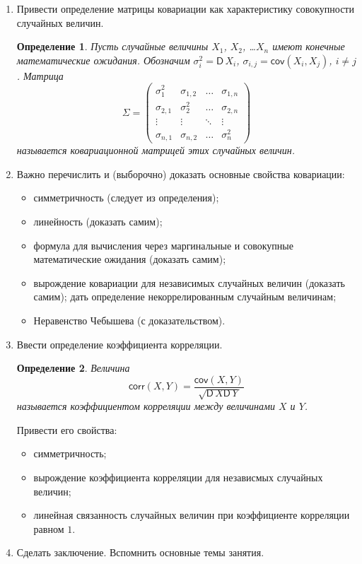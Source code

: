 \documentclass[14pt]{extarticle}
\newcommand{\cov}{\mathsf{cov}}
\newcommand{\corr}{\mathsf{corr}}
\newcommand{\var}{\mathsf{D}\,}
\theoremstyle{theorem}
\newtheorem{definition}{Определение}
\theoremstyle{remark}
\begin{document}
\begin{enumerate}
    \item Привести определение матрицы ковариации как характеристику совокупности случайных величин. 
    \begin{definition}
  Пусть случайные величины  $X_1$, $X_2$, \ldots $X_n$ имеют конечные математические
  ожидания. Обозначим $\sigma_i^2=\var X_i$, $\sigma_{i,j}=\cov(X_i, X_j)$, $i\neq
  j$. Матрица 
  \[
  \Sigma=
  \begin{pmatrix}
    \sigma_1^2 & \sigma_{1,2} & \ldots & \sigma_{1,n}\\
    \sigma_{2,1} & \sigma_{2}^2 & \ldots & \sigma_{2,n}\\
    \vdots & \vdots & \ddots & \vdots\\
    \sigma_{n,1} & \sigma_{n,2} & \ldots & \sigma_n^2
  \end{pmatrix}
  \]
  называется \emph{ковариационной матрицей} этих случайных величин.
\end{definition}
    \item Важно перечислить и (выборочно) доказать основные свойства ковариации:
    \begin{itemize}
        \item симметричность (следует из определения);
        \item линейность (доказать самим);
        \item формула для вычисления через маргинальные и совокупные математические ожидания (доказать самим);
        \item вырождение ковариации для независимых случайных величин (доказать самим); дать определение некоррелированным случайным величинам;
        \item Неравенство Чебышева (с доказательством).
    \end{itemize}
    \item Ввести определение коэффициента корреляции. 
    \begin{definition}
  Величина 
  \[
  \corr(X,Y)=\dfrac{\cov(X,Y)}{\sqrt{\var X \var Y}}
  \]
  называется \emph{коэффициентом корреляции} между величинами $X$ и $Y$.
\end{definition}
    Привести его свойства:
    \begin{itemize}
        \item симметричность;
        \item вырождение коэффициента корреляции для независмых случайных величин;
        \item линейная связанность случайных величин при коэффициенте корреляции равном $1$.
    \end{itemize}
    \item Сделать заключение. Вспомнить основные темы занятия.
\end{enumerate}
\end{document}
